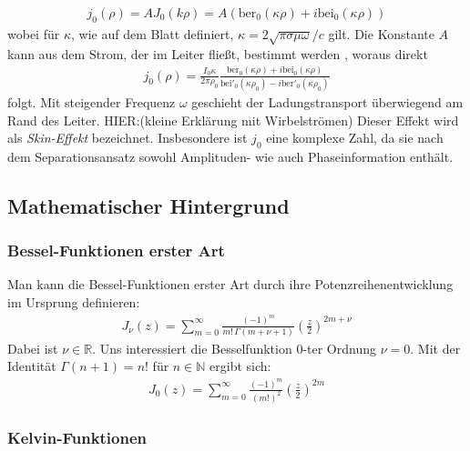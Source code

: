 \documentclass[10pt,a4paper]{article}
\begin{document}
\begin{align}
	j_0(\rho)=A J_0(k \rho) = A(\mathrm{ber}_0(\kappa \rho)+i\mathrm{bei}_0(\kappa \rho))
\end{align}
wobei für $\kappa$, wie auf dem Blatt definiert, $\kappa = 2 \sqrt{\pi \sigma \mu \omega}/c$ gilt.
Die Konstante $A$ kann aus dem Strom, der im Leiter fließt, bestimmt werden \cite{kazimierczuk}, woraus direkt
\begin{align}
	j_0(\rho) = \frac{I_0 \kappa}{2\pi\rho_0}\frac{\mathrm{ber}_0(\kappa\rho)+i \mathrm{bei}_0(\kappa\rho)}{\mathrm{bei}'_0(\kappa\rho_0)-i\mathrm{ber}'_0(\kappa\rho_0)}
\label{eq:stromdichte}
\end{align}
folgt. Mit steigender Frequenz $\omega$ geschieht der Ladungstransport überwiegend am Rand des Leiter. HIER:(kleine Erklärung mit Wirbelströmen) Dieser Effekt wird als \emph{Skin-Effekt} bezeichnet. Insbesondere ist $j_0$ eine komplexe Zahl, da sie nach dem Separationsansatz sowohl Amplituden- wie auch Phaseinformation enthält.


\subsection{Mathematischer Hintergrund}

\subsubsection{Bessel-Funktionen erster Art}

Man kann die Bessel-Funktionen erster Art durch ihre Potenzreihenentwicklung im Ursprung definieren:
\begin{align}
	J_\nu(z) = \sum^{\infty}_{m=0} \frac{\left( -1 \right)^m}{m! \, \Gamma(m + \nu + 1)} \left(\frac{z}{2}\right)^{2m+\nu}
\end{align}
Dabei ist $\nu \in \mathbb{R}$. Uns interessiert die Besselfunktion 0-ter Ordnung $\nu = 0$.
Mit der Identität $\Gamma(n+1) = n!$ für $n \in \mathbb{N}$ ergibt sich:
\begin{align}
	\label{eq:bessel0}
	J_0(z) = \sum^{\infty}_{m=0} \frac{\left( -1 \right)^m}{\left( m! \right)^2} \left( \frac{z}{2} \right)^{2m}
\end{align}

\subsubsection{Kelvin-Funktionen}
\label{sssec:kelvin-funktionen}
\end{document}
